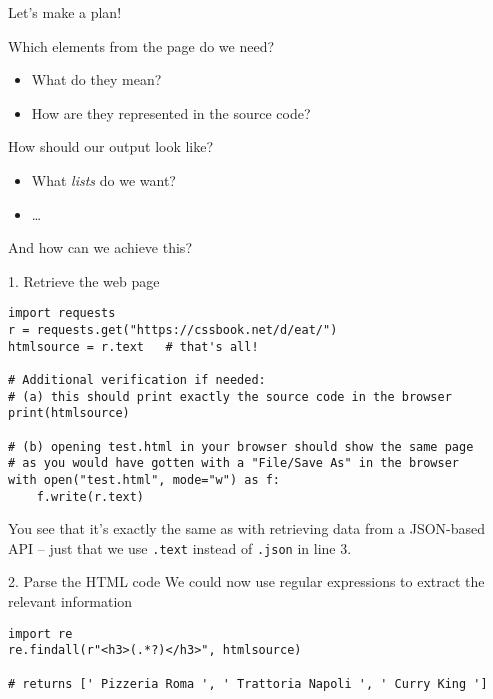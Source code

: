 \begin{frame}{Let's make a plan!}
\begin{block}{Which elements from the page do we need?}
\begin{itemize}
\item What do they mean?
\item How are they represented in the source code?
\end{itemize}
\end{block}
\begin{block}{How should our output look like?}
\begin{itemize}
\item What \emph{lists} do we want?
\item \ldots
\end{itemize}
\end{block}
And how can we achieve this?
\end{frame}


\begin{frame}[fragile]{1. Retrieve the web page}
\begin{verbatim}
import requests
r = requests.get("https://cssbook.net/d/eat/")
htmlsource = r.text   # that's all!

# Additional verification if needed:
# (a) this should print exactly the source code in the browser
print(htmlsource)

# (b) opening test.html in your browser should show the same page
# as you would have gotten with a "File/Save As" in the browser
with open("test.html", mode="w") as f:
    f.write(r.text)
\end{verbatim}
You see that it's exactly the same as with retrieving data from a JSON-based API -- just that we use  \texttt{.text} instead of \texttt{.json} in line 3.
\end{frame}

\begin{frame}[fragile]{2. Parse the HTML code}
We could now use regular expressions to extract the relevant information
\pause
\begin{verbatim}
import re    
re.findall(r"<h3>(.*?)</h3>", htmlsource)

# returns [' Pizzeria Roma ', ' Trattoria Napoli ', ' Curry King ']
\end{verbatim}
\end{frame}

